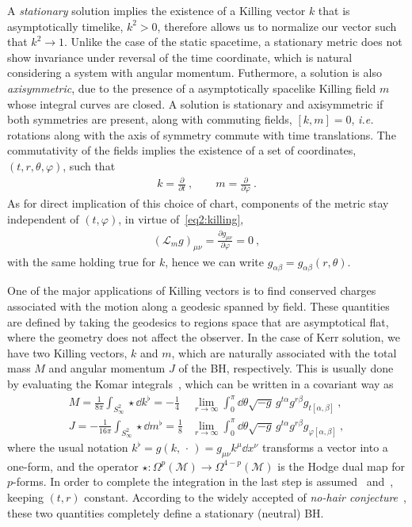 A \emph{stationary} solution implies the existence of a Killing vector $k$ that is asymptotically timelike, $k^2>0$, therefore allows us to normalize our vector such that $k^2 \rightarrow 1$. 
Unlike the case of the static spacetime, a stationary metric does not show invariance under reversal of the time coordinate, which is natural considering a system with angular momentum. 
Futhermore, a solution is also \emph{axisymmetric}, due to the presence of a asymptotically spacelike Killing field $m$ whose integral curves are closed.
A solution is stationary and axisymmetric if both symmetries are present, along with commuting fields, $[k , m] = 0$, \emph{i.e.} rotations along with the axis of symmetry commute with time translations. The commutativity of the fields implies the existence of a set of coordinates, $(t,r,\theta,\varphi)$, such that
\begin{align}
    k = \frac{\partial}{\partial t} ~, \qquad m = \frac{\partial}{\partial \varphi} ~.
    \label{eq2:tPhiKilling}
\end{align}
As for direct implication of this choice of chart, components of the metric stay independent of $(t,\varphi)$, in virtue of~\eqref{eq2:killing},
\begin{align}
    (\mathcal{L}_m g)_{\mu\nu} = \frac{\partial g_{\mu\nu}}{\partial \varphi} = 0 ~,
    \label{eq2:lieMetricTPhi}
\end{align}
with the same holding true for $k$, hence we can write $g_{\alpha\beta} = g_{\alpha\beta}(r,\theta)$. 

One of the major applications of Killing vectors is to find conserved charges associated with the motion along a geodesic spanned by field.
These quantities are defined by taking the geodesics to regions space that are asymptotical flat, where the geometry does not affect the observer.
In the case of Kerr solution, we have two Killing vectors, $k$ and $m$, which are naturally associated with the total mass $M$ and angular momentum $J$ of the BH, respectively.
This is usually done by evaluating the Komar integrals~\cite{Heusler1996, Wald2010}, which can be written in a covariant way as
\begin{align}
    M = \frac{1}{8 \pi} \int_{S^2_\infty} \star \dd k^\flat  =  -\frac{1}{4}& \lim_{r\to\infty}  \int_0^\pi \dd\theta \sqrt{-g} \, g^{t\alpha} g^{r\beta} g_{t[\alpha,\beta]} ~, \label{eq2:komarMass} \\
    J = -\frac{1}{16 \pi} \int_{S^2_\infty} \star \dd m^\flat = \frac{1}{8}& \lim_{r\to\infty}  \int_0^\pi \dd\theta \sqrt{-g} \, g^{t\alpha} g^{r\beta} g_{\varphi[\alpha,\beta]} ~, \label{eq2:komarSpin}
\end{align}
where the usual notation $k^\flat = g(k, \,\cdot\,) = g_{\mu\nu} k^\mu \dd x^\nu$ transforms a vector into a one-form, and the operator $\star : \Omega^{p}(\mathcal{M})\to\Omega^{4-p}(\mathcal{M})$ is the Hodge dual map for $p$-forms.
In order to complete the integration in the last step is assumed~ and~, keeping $(t,r)$ constant. 
According to the widely accepted of \emph{no-hair conjecture}~\cite{Carter1971}, these two quantities completely define a stationary (neutral) BH. 

